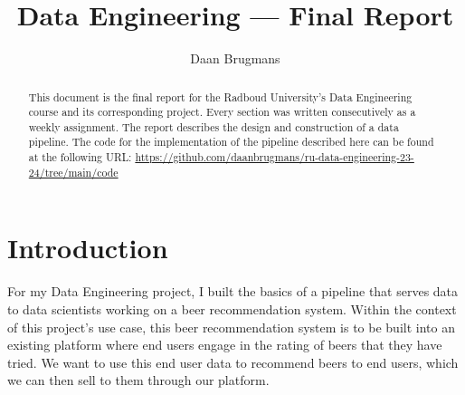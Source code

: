 \documentclass[sigconf]{acmart}
\begin{document}
\title[]{Data Engineering --- Final Report}

\author{Daan Brugmans}

\renewcommand{\shortauthors}{Daan Brugmans}

\begin{abstract}
  This document is the final report for the Radboud University's Data Engineering course and its corresponding project.
  Every section was written consecutively as a weekly assignment.
  The report describes the design and construction of a data pipeline.
  The code for the implementation of the pipeline described here can be found at the following URL: \url{https://github.com/daanbrugmans/ru-data-engineering-23-24/tree/main/code}
\end{abstract}

\maketitle

\section{Introduction}
For my Data Engineering project, I built the basics of a pipeline that serves data to data scientists working on a beer recommendation system.
Within the context of this project's use case, this beer recommendation system is to be built into an existing platform where end users engage in the rating of beers that they have tried.
We want to use this end user data to recommend beers to end users, which we can then sell to them through our platform.
\end{document}
